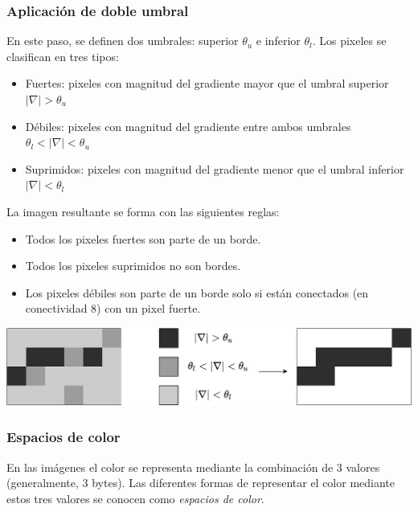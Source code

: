 \begin{frame}\frametitle{Aplicación de doble umbral}
  En este paso, se definen dos umbrales: superior $\theta_u$ e inferior $\theta_l$. Los pixeles se clasifican en tres tipos:
  \begin{itemize}
  \item Fuertes: pixeles con magnitud del gradiente mayor que el umbral superior $|\nabla | > \theta_u$
  \item Débiles: pixeles con magnitud del gradiente entre ambos umbrales $\theta_l < |\nabla| < \theta_u$
  \item Suprimidos: pixeles con magnitud del gradiente menor que el umbral inferior $|\nabla| < \theta_l$
  \end{itemize}
  La imagen resultante se forma con las siguientes reglas:
  \begin{itemize}
  \item Todos los pixeles fuertes son parte de un borde.
  \item Todos los pixeles suprimidos no son bordes. 
  \item Los pixeles débiles son parte de un borde solo si están conectados (en conectividad 8) con un pixel fuerte.
  \end{itemize}
  \includegraphics[width=\textwidth]{Figures/DoubleThreshold.pdf}
\end{frame}

\begin{frame}\frametitle{Espacios de color}
En las imágenes el color se representa mediante la combinación de 3 valores (generalmente, 3 bytes). Las diferentes formas de representar el color mediante estos tres valores se conocen como \textit{espacios de color}.
\end{frame}
